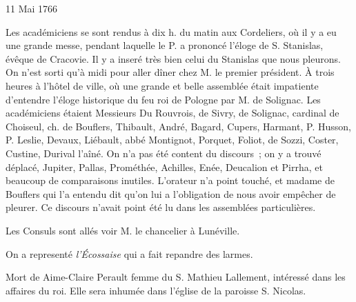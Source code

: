                      \begin{diary}{11 Mai 1766}{}
                        
                         Les académiciens se sont rendus
                           à dix h.
                           du matin aux
                              Cordeliers, où il y a eu une
                           grande messe, pendant laquelle le P. 
                           a prononcé l'éloge de S. Stanislas, évêque de
                              Cracovie. Il y a inseré très bien celui du
                           Stanislas que nous pleurons.
                           On n'est sorti
                           qu'à midi pour aller dîner chez
                           M. le premier président.
                           À trois heures à l'hôtel de
                              ville, où une
                           grande et belle assemblée était impatiente
                           d'entendre l'éloge historique du feu roi de Pologne
                           par M. de Solignac. Les
                           académiciens étaient
                           Messieurs
                           Du Rouvrois, de Sivry, de
                           Solignac, cardinal
                              de Choiseul, ch. de Bouflers, Thibault, André,
                           Bagard, Cupers, Harmant,
                              P. Husson, P. Leslie,
                           Devaux, Liébault, abbé
                              Montignot, Porquet,
                           Foliot, de
                              Sozzi, Coster, Custine, 
                           Durival l'aîné.
                           On n'a pas été content du discours ; on y a
                           trouvé déplacé, Jupiter,
                              Pallas, Prométhée,
                           Achilles, Enée,
                              Deucalion et Pirrha, et
                           beaucoup
                           de comparaisons inutiles. L'orateur n'a point
                           touché, et madame de Bouflers qui l'a entendu dit qu'on lui a
                           l'obligation de nous avoir
                           empêcher de pleurer. Ce discours n'avait point
                           été lu dans les assemblées particulières. \bigskip
        
        
                         Les Consuls sont allés voir M. le chancelier
                           à Lunéville. \bigskip
        
        
                         On a representé \emph{l'Écossaise} qui a fait
                           repandre des larmes. \bigskip
        
        
                         Mort de Aime-Claire Perault
                           femme du S. Mathieu
                              Lallement, intéressé
                           dans les affaires du roi.
                           Elle sera inhumée
                           dans l’église de la paroisse S. Nicolas.
                        \bigskip
        
        
                     \end{diary}

